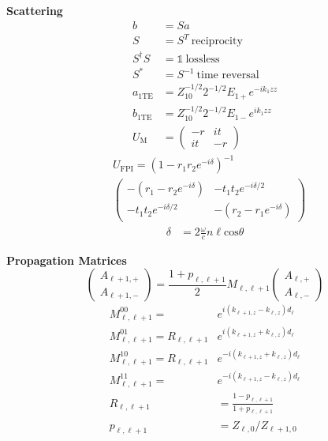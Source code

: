 \documentclass[12pt]{article}
\begin{document}
\begin{multicols}{3}
\textbf{Scattering}
\begin{align}
  b &= Sa\\
  S &= S^T \ \textrm{reciprocity}\\
  S^{\dagger} S &= \mathbb{1} \ \textrm{lossless}\\
  S^{*} &= S^{-1} \ \textrm{time reversal}\\
  a_{1 \textrm{TE}} &= Z_{10}^{-1/2}2^{-1/2}E_{1+}e^{-ik_1z z}\\
  b_{1 \textrm{TE}} &= Z_{10}^{-1/2}2^{-1/2}E_{1-}e^{ik_1z z}\\
  U_{\textrm{M}} &=
  \begin{pmatrix}
    -r & it\\
    it & -r
  \end{pmatrix}
\end{align}
\begin{equation}
  \begin{split}
    &U_{\textrm{FPI}} = (1- r_1r_2e^{-i \delta})^{-1}\\
    &\begin{pmatrix}
       -(r_1 - r_2e^{-i \delta}) & -t_1t_2e^{-i\delta/2}\\
       -t_1t_2e^{-i\delta/2} & -(r_2-r_1e^{-i\delta})
     \end{pmatrix}
  \end{split}
\end{equation}
\vspace{-2em}
\begin{align}
  \delta &= 2 \frac{\omega}{c} n \ell \textrm{cos}\theta
\end{align}

\textbf{Propagation Matrices}
\begin{equation}
  \begin{pmatrix}A_{\ell + 1,+}\\A_{\ell + 1, -}\end{pmatrix} =
  \textstyle{\frac{1 + p_{\ell, \ell + 1}}{2}} M_{\ell, \ell + 1}
  \begin{pmatrix}
    A_{\ell, +}\\
    A_{\ell, -}
  \end{pmatrix}
\end{equation}
\begin{align}
  M_{\ell, \ell + 1}^{00} = &e^{i(k_{\ell + 1, z} - k_{\ell ,z})d_\ell}\\
  M_{\ell, \ell + 1}^{01} = R_{\ell, \ell + 1} &e^{i(k_{\ell + 1, z} + k_{\ell, z})d_\ell}\\
  M_{\ell, \ell + 1}^{10} = R_{\ell, \ell + 1} &e^{-i(k_{\ell + 1, z} + k_{\ell, z})d_\ell}\\
  M_{\ell, \ell + 1}^{11} = &e^{-i(k_{\ell + 1, z} - k_{\ell, z})d_\ell}\\
  R_{\ell, \ell + 1} &= \frac{1 - p_{\ell, \ell + 1}}{1 + p_{\ell, \ell + 1}}\\
  p_{\ell, \ell + 1} &= Z_{\ell, 0} / Z_{\ell + 1, 0}
\end{align}


\end{multicols}
\end{document}

